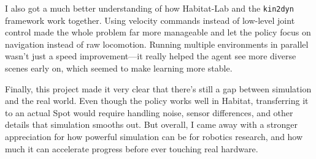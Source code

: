 \documentclass{article} %
\begin{document}
I also got a much better understanding of how Habitat-Lab and the \texttt{kin2dyn} framework work together. Using velocity commands instead of low-level joint control made the whole problem far more manageable and let the policy focus on navigation instead of raw locomotion. Running multiple environments in parallel wasn’t just a speed improvement—it really helped the agent see more diverse scenes early on, which seemed to make learning more stable.

Finally, this project made it very clear that there’s still a gap between simulation and the real world. Even though the policy works well in Habitat, transferring it to an actual Spot would require handling noise, sensor differences, and other details that simulation smooths out. But overall, I came away with a stronger appreciation for how powerful simulation can be for robotics research, and how much it can accelerate progress before ever touching real hardware.

\newpage
\printbibliography
\end{document}
